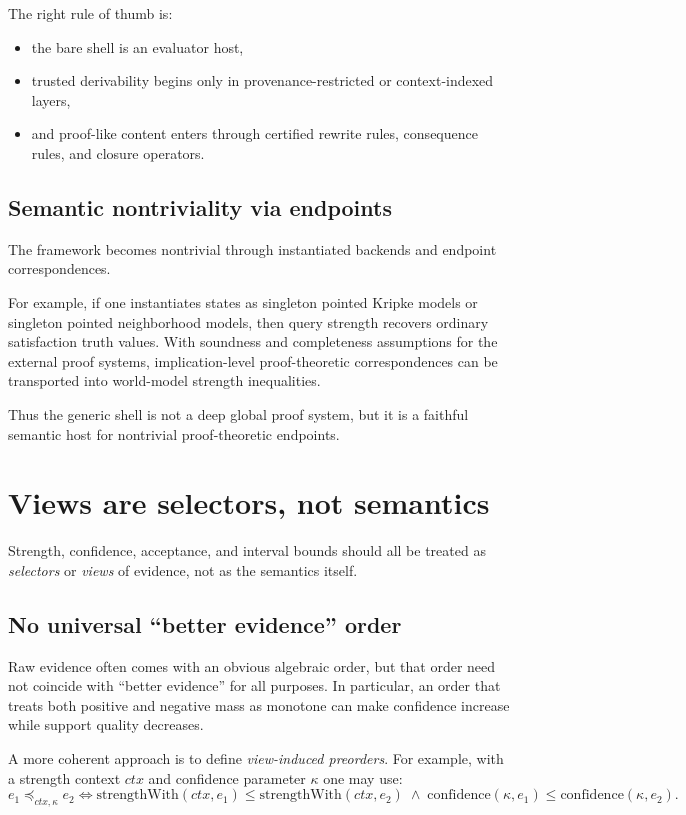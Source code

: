 \documentclass[11pt]{article}
\begin{document}
The right rule of thumb is:
\begin{itemize}
  \item the bare shell is an evaluator host,
  \item trusted derivability begins only in provenance-restricted or
        context-indexed layers,
  \item and proof-like content enters through certified rewrite rules,
        consequence rules, and closure operators.
\end{itemize}

\subsection{Semantic nontriviality via endpoints}

The framework becomes nontrivial through instantiated backends and endpoint
correspondences.

For example, if one instantiates states as singleton pointed Kripke models or
singleton pointed neighborhood models, then query strength recovers ordinary
satisfaction truth values.  With soundness and completeness assumptions for the
external proof systems, implication-level proof-theoretic correspondences can be
transported into world-model strength inequalities.

Thus the generic shell is not a deep global proof system, but it is a faithful
semantic host for nontrivial proof-theoretic endpoints.

\section{Views are selectors, not semantics}

Strength, confidence, acceptance, and interval bounds should all be treated as
\emph{selectors} or \emph{views} of evidence, not as the semantics itself.

\subsection{No universal ``better evidence'' order}

Raw evidence often comes with an obvious algebraic order, but that order need
not coincide with ``better evidence'' for all purposes.  In particular, an order
that treats both positive and negative mass as monotone can make confidence
increase while support quality decreases.

A more coherent approach is to define \emph{view-induced preorders}.  For
example, with a strength context $ctx$ and confidence parameter $\kappa$ one may
use:
\[
  e_1 \preceq_{ctx,\kappa} e_2
  \iff
  \mathrm{strengthWith}(ctx,e_1) \le \mathrm{strengthWith}(ctx,e_2)
  \;\wedge\;
  \mathrm{confidence}(\kappa,e_1) \le \mathrm{confidence}(\kappa,e_2).
\]
\end{document}
